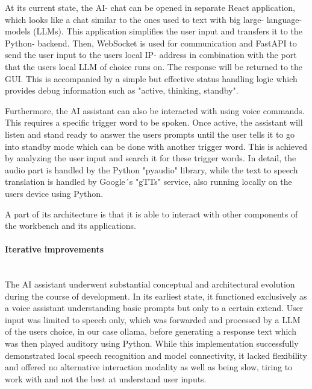 \documentclass[a4paper,12pt]{article}
\begin{document}
At its current state, the AI- chat can be opened in separate React application, which looks like a chat similar to the ones used to text with big large- language- models (LLMs).
This application simplifies the user input and transfers it to the Python- backend. Then, WebSocket\cite{websocket} is used for communication and FastAPI\cite{fastapi} to send the user input to the users local IP- address in combination with the port that the users local LLM of choice runs on. 
The response will be returned to the GUI. 
This is accompanied by a simple but effective status handling logic which provides debug information such as "active, thinking, standby". 

Furthermore, the AI assistant can also be interacted with using voice commands. This requires a specific trigger word to be spoken. Once active, the assistant will listen and stand ready to answer the users prompts until the user tells it to go into standby mode which can be done with another trigger word. 
This is achieved by analyzing the user input and search it for these trigger words. 
In detail, the audio part is handled by the Python "pyaudio" library\cite{pyaudio}, while the text to speech translation is handled by Google´s "gTTs" service\cite{gtts}, also running locally on the users device using Python. 

A part of its architecture is that it is able to interact with other components of the workbench and its applications. 

\newpage
\paragraph{Iterative improvements}\mbox{} \\
The AI assistant underwent substantial conceptual and architectural evolution during the course of development. In its earliest state, it functioned exclusively as a voice assistant understanding basic prompts but only to a certain extend. User input was limited to speech only, which was forwarded and processed by a LLM of the users choice, in our case ollama\cite{ollama}, before generating a response text which was then played auditory using Python. While this implementation successfully demonstrated local speech recognition and model connectivity, it lacked flexibility and offered no alternative interaction modality as well as being slow, tiring to work with and not the best at understand user inputs. 
\end{document}
